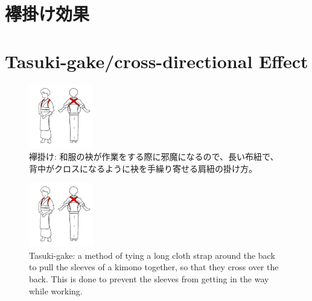 \documentclass[a4paper,xelatex,ja=standard]{bxjsarticle}
\begin{document}
\ifJPN
  \section{襷掛け効果}
\else
  \section{Tasuki-gake/cross-directional Effect}
\fi




\ifJPN
  \TasukiGakeEffectJa
\else
  \TasukiGakeEffectEn
\fi


\ifJPN
  \begin{figure}[htb]\centering\small
    \includegraphics[width=0.25\textwidth]{./figures/tasuki-gake01.png}
    \caption{襷掛け: 和服の袂が作業をする際に邪魔になるので、長い布紐で、背中がクロスになるように袂を手繰り寄せる肩紐の掛け方。}\label{fig:tasuki-gake-picture-j}
  \end{figure}
\else
  \begin{figure}[htb]\centering\small
    \includegraphics[width=0.25\textwidth]{./figures/tasuki-gake01.png}
    \caption{Tasuki-gake: a method of tying a long cloth strap around the back to pull the sleeves of a kimono together, so that they cross over the back. This is done to prevent the sleeves from getting in the way while working.}\label{fig:tasuki-gake-picture}
  \end{figure}
\fi
\end{document}
